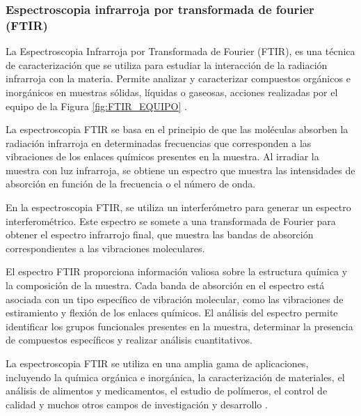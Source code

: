 \documentclass[12pt]{article}
\begin{document}
        

       \subsubsection{Espectroscopia infrarroja por transformada de fourier (FTIR)}
        La Espectroscopia Infrarroja por Transformada de Fourier (FTIR), es una técnica de caracterización que se utiliza para estudiar la interacción de la radiación infrarroja con la materia. Permite analizar y caracterizar compuestos orgánicos e inorgánicos en muestras sólidas, líquidas o gaseosas, acciones realizadas por el equipo de la Figura \ref{fig:FTIR_EQUIPO}  \cite{IEEEreferencias:FTIR}.\vspace{1em} %

        La espectroscopia FTIR se basa en el principio de que las moléculas absorben la radiación infrarroja en determinadas frecuencias que corresponden a las vibraciones de los enlaces químicos presentes en la muestra. Al irradiar la muestra con luz infrarroja, se obtiene un espectro que muestra las intensidades de absorción en función de la frecuencia o el número de onda.
        \vspace{1em} %
        
        En la espectroscopia FTIR, se utiliza un interferómetro para generar un espectro interferométrico. Este espectro se somete a una transformada de Fourier para obtener el espectro infrarrojo final, que muestra las bandas de absorción correspondientes a las vibraciones moleculares.
        \vspace{1em} %
        
        El espectro FTIR proporciona información valiosa sobre la estructura química y la composición de la muestra. Cada banda de absorción en el espectro está asociada con un tipo específico de vibración molecular, como las vibraciones de estiramiento y flexión de los enlaces químicos. El análisis del espectro permite identificar los grupos funcionales presentes en la muestra, determinar la presencia de compuestos específicos y realizar análisis cuantitativos.\vspace{1em} %
        
        La espectroscopia FTIR se utiliza en una amplia gama de aplicaciones, incluyendo la química orgánica e inorgánica, la caracterización de materiales, el análisis de alimentos y medicamentos, el estudio de polímeros, el control de calidad y muchos otros campos de investigación y desarrollo \cite{IEEEreferencias:FTIR}.
        
\end{document}

